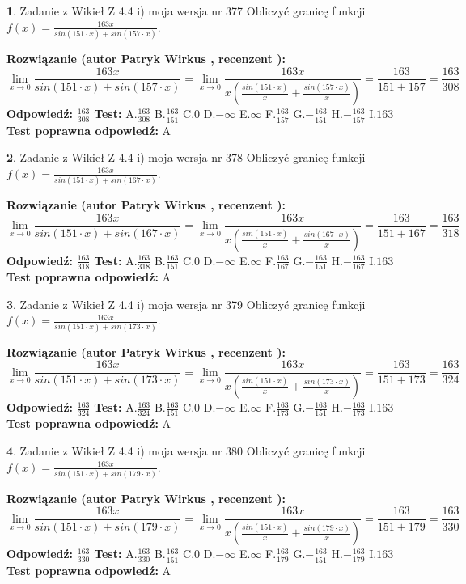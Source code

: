 \documentclass[12pt, a4paper]{article}
\theoremstyle{definition} %
\newtheorem{zad}{}
\newcommand{\zadStart}[1]{\begin{zad}#1\newline}
\newcommand{\zadStop}{\end{zad}}
\newcommand{\rozwStart}[2]{\noindent \textbf{Rozwiązanie (autor #1 , recenzent #2): }\newline}
\newcommand{\rozwStop}{\newline}
\newcommand{\odpStart}{\noindent \textbf{Odpowiedź:}\newline}
\newcommand{\odpStop}{\newline}
\newcommand{\testStart}{\noindent \textbf{Test:}\newline}
\newcommand{\testStop}{\newline}
\newcommand{\kluczStart}{\noindent \textbf{Test poprawna odpowiedź:}\newline}
\newcommand{\kluczStop}{\newline}
\begin{document}
\zadStart{Zadanie z Wikieł Z 4.4 i) moja wersja nr 377}
Obliczyć granicę funkcji $f(x)=\frac{163x}{sin(151\cdot x) +sin(157\cdot x)}$.
\zadStop
\rozwStart{Patryk Wirkus}{}
$$\lim\limits_{x\to 0}\frac{163x}{sin(151\cdot x) +sin(157\cdot x)}=\lim\limits_{x\to 0}\frac{163x}{x(\frac{sin(151\cdot x)}{x}+\frac{sin(157\cdot x)}{x})}=\frac{163}{151+157} = \frac{163}{308}$$
\rozwStop
\odpStart
$\frac{163}{308}$
\odpStop
\testStart
A.$\frac{163}{308}$
B.$\frac{163}{151}$
C.$0$
D.$-\infty$
E.$\infty$
F.$\frac{163}{157}$
G.$-\frac{163}{151}$
H.$-\frac{163}{157}$
I.$163$
\testStop
\kluczStart
A
\kluczStop



\zadStart{Zadanie z Wikieł Z 4.4 i) moja wersja nr 378}
Obliczyć granicę funkcji $f(x)=\frac{163x}{sin(151\cdot x) +sin(167\cdot x)}$.
\zadStop
\rozwStart{Patryk Wirkus}{}
$$\lim\limits_{x\to 0}\frac{163x}{sin(151\cdot x) +sin(167\cdot x)}=\lim\limits_{x\to 0}\frac{163x}{x(\frac{sin(151\cdot x)}{x}+\frac{sin(167\cdot x)}{x})}=\frac{163}{151+167} = \frac{163}{318}$$
\rozwStop
\odpStart
$\frac{163}{318}$
\odpStop
\testStart
A.$\frac{163}{318}$
B.$\frac{163}{151}$
C.$0$
D.$-\infty$
E.$\infty$
F.$\frac{163}{167}$
G.$-\frac{163}{151}$
H.$-\frac{163}{167}$
I.$163$
\testStop
\kluczStart
A
\kluczStop



\zadStart{Zadanie z Wikieł Z 4.4 i) moja wersja nr 379}
Obliczyć granicę funkcji $f(x)=\frac{163x}{sin(151\cdot x) +sin(173\cdot x)}$.
\zadStop
\rozwStart{Patryk Wirkus}{}
$$\lim\limits_{x\to 0}\frac{163x}{sin(151\cdot x) +sin(173\cdot x)}=\lim\limits_{x\to 0}\frac{163x}{x(\frac{sin(151\cdot x)}{x}+\frac{sin(173\cdot x)}{x})}=\frac{163}{151+173} = \frac{163}{324}$$
\rozwStop
\odpStart
$\frac{163}{324}$
\odpStop
\testStart
A.$\frac{163}{324}$
B.$\frac{163}{151}$
C.$0$
D.$-\infty$
E.$\infty$
F.$\frac{163}{173}$
G.$-\frac{163}{151}$
H.$-\frac{163}{173}$
I.$163$
\testStop
\kluczStart
A
\kluczStop



\zadStart{Zadanie z Wikieł Z 4.4 i) moja wersja nr 380}
Obliczyć granicę funkcji $f(x)=\frac{163x}{sin(151\cdot x) +sin(179\cdot x)}$.
\zadStop
\rozwStart{Patryk Wirkus}{}
$$\lim\limits_{x\to 0}\frac{163x}{sin(151\cdot x) +sin(179\cdot x)}=\lim\limits_{x\to 0}\frac{163x}{x(\frac{sin(151\cdot x)}{x}+\frac{sin(179\cdot x)}{x})}=\frac{163}{151+179} = \frac{163}{330}$$
\rozwStop
\odpStart
$\frac{163}{330}$
\odpStop
\testStart
A.$\frac{163}{330}$
B.$\frac{163}{151}$
C.$0$
D.$-\infty$
E.$\infty$
F.$\frac{163}{179}$
G.$-\frac{163}{151}$
H.$-\frac{163}{179}$
I.$163$
\testStop
\kluczStart
A
\kluczStop
\end{document}
